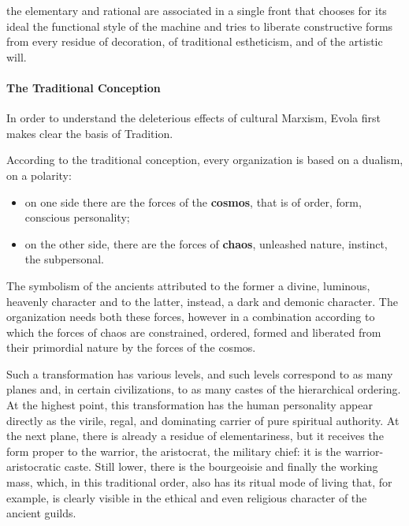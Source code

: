\begin{quotex}
the elementary and rational are associated in a single front that chooses for its ideal the functional style of the machine and tries to liberate constructive forms from every residue of decoration, of traditional estheticism, and of the artistic will.

\end{quotex}
\paragraph{The Traditional Conception}
In order to understand the deleterious effects of cultural Marxism, Evola first makes clear the basis of Tradition.

\begin{quotationx}
According to the traditional conception, every organization is based on a dualism, on a polarity:

\begin{itemize}
\item
on one side there are the forces of the \textbf{cosmos}, that is of order, form, conscious personality; 
\item
on the other side, there are the forces of \textbf{chaos}, unleashed nature, instinct, the subpersonal. 
\end{itemize}

The symbolism of the ancients attributed to the former a divine, luminous, heavenly character and to the latter, instead, a dark and demonic character. The organization needs both these forces, however in a combination according to which the forces of chaos are constrained, ordered, formed and liberated from their primordial nature by the forces of the cosmos.

Such a transformation has various levels, and such levels correspond to as many planes and, in certain civilizations, to as many castes of the hierarchical ordering. At the highest point, this transformation has the human personality appear directly as the virile, regal, and dominating carrier of pure spiritual authority. At the next plane, there is already a residue of elementariness, but it receives the form proper to the warrior, the aristocrat, the military chief: it is the warrior-aristocratic caste. Still lower, there is the bourgeoisie and finally the working mass, which, in this traditional order, also has its ritual mode of living that, for example, is clearly visible in the ethical and even religious character of the ancient guilds.

\end{quotationx}
